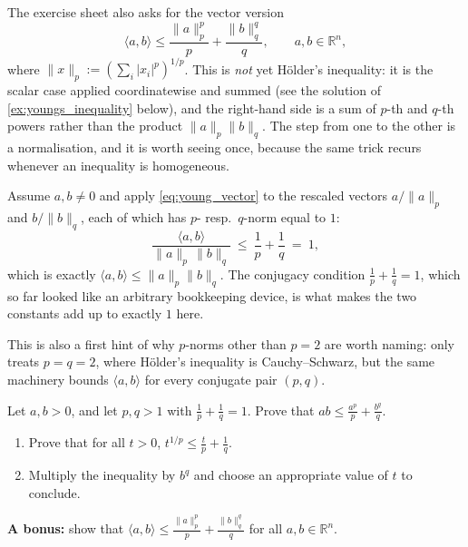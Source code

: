 \begin{remark}
\label{rem:young_to_hoelder}
The exercise sheet also asks for the vector version
\begin{equation}
\label{eq:young_vector}
  \langle a,b\rangle \leq \frac{\|a\|_p^p}{p} + \frac{\|b\|_q^q}{q}, \qquad a,b \in \mathbb{R}^n,
\end{equation}
where $\|x\|_p := \left(\sum_i |x_i|^p\right)^{1/p}$. This is \emph{not} yet Hölder's inequality:
it is the scalar case applied coordinatewise and summed (see the solution of \cref{ex:youngs_inequality}
below), and the right-hand side is a sum of $p$-th and $q$-th powers rather than the product
$\|a\|_p\|b\|_q$. The step from one to the other is a normalisation, and it is worth seeing
once, because the same trick recurs whenever an inequality is homogeneous.

Assume $a,b \neq 0$ and apply \eqref{eq:young_vector} to the rescaled vectors
$a/\|a\|_p$ and $b/\|b\|_q$, each of which has $p$- resp.\ $q$-norm equal to $1$:
\[
  \frac{\langle a,b\rangle}{\|a\|_p\,\|b\|_q} \ \leq\ \frac{1}{p} + \frac{1}{q} \ =\ 1,
\]
which is exactly  
$\langle a,b\rangle \leq \|a\|_p\|b\|_q$. The conjugacy condition
$\tfrac1p+\tfrac1q=1$, which so far looked like an arbitrary bookkeeping device, is what makes
the two constants add up to exactly $1$ here.

This is also a first hint of why $p$-norms other than $p=2$ are worth naming:
 only treats $p = q = 2$, where Hölder's inequality is
Cauchy--Schwarz, but the same machinery bounds $\langle a, b\rangle$ for every conjugate pair
$(p,q)$.
\end{remark}

\begin{exercise}
\label{ex:youngs_inequality}
Let $a,b > 0$, and let $p,q>1$ with $\tfrac{1}{p}+\tfrac{1}{q}=1$. Prove that
$ab \leq \tfrac{a^p}{p} + \tfrac{b^q}{q}$.
\begin{enumerate}[label=\textbf{(\alph*)}]
  \item Prove that for all $t>0$, $t^{1/p} \leq \tfrac{t}{p} + \tfrac{1}{q}$.
  \item Multiply the inequality by $b^q$ and choose an appropriate value of $t$ to conclude.
\end{enumerate}
\textbf{A bonus:} show that $\langle a,b\rangle \leq \tfrac{\|a\|_p^p}{p} + \tfrac{\|b\|_q^q}{q}$
for all $a,b \in \mathbb{R}^n$.
\end{exercise}
